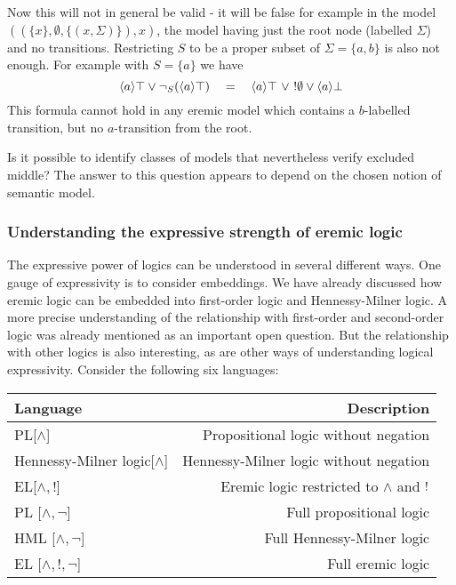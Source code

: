 \NI Now this will not in general be valid - it will be false for
example in the model $((\{x\}, \emptyset, \{(x, \Sigma)\}), x)$, the
model having just the root node (labelled $\Sigma$) and no transitions.
Restricting $S$ to be a proper subset of $\Sigma = \{a, b\}$ is also not
enough. For example with $S = \{a\}$ we have
\[
   \langle a \rangle \top \lor \neg_{S}(\langle a \rangle \top)
      \quad=\quad
   \langle a \rangle \top\ \lor\ !\emptyset \lor \langle a \rangle \bot
\]
This formula cannot hold in any eremic model which contains a
$b$-labelled transition, but no $a$-transition from the root.

Is it possible to identify classes of models that nevertheless verify
excluded middle? The answer to this question appears to depend 
on the chosen notion of semantic model.

\subsubsection{Understanding the expressive strength of eremic logic}

The expressive power of logics can be understood in several different
ways. One gauge of expressivity is to consider embeddings.  We have
already discussed how eremic logic can be embedded into first-order
logic and Hennessy-Milner logic.  A more precise understanding of the
relationship with first-order and second-order logic was already
mentioned as an important open question. But the relationship with
other logics is also interesting, as are other ways of understanding
logical expressivity.  Consider the following six languages:



\begin{center}
\begin{tabular}{ l | r }
Language & Description \\
\hline
PL[$\land$] & Propositional logic without negation \\
Hennessy-Milner logic[$\land$] & Hennessy-Milner logic without negation \\
EL[$\land, !$] & Eremic logic restricted to $\land$ and $!$ \\
PL [$\land, \neg$] & Full propositional logic \\
HML [$\land, \neg$] & Full Hennessy-Milner logic \\
EL [$\land, !, \neg$] & Full eremic logic \\
\end{tabular}
\end{center}


